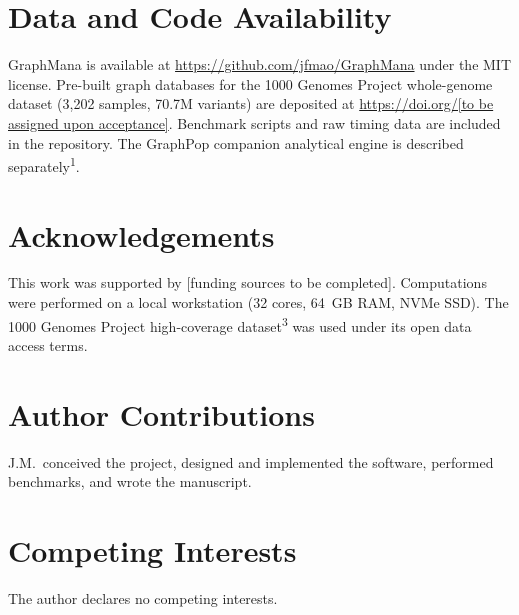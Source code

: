 \documentclass[11pt,a4paper]{article}
\newcommand{\citenum}[1]{\textsuperscript{#1}}
\begin{document}

\section*{Data and Code Availability}

GraphMana is available at \url{https://github.com/jfmao/GraphMana} under the MIT license. Pre-built graph databases for the 1000 Genomes Project whole-genome dataset (3,202 samples, 70.7M variants) are deposited at \url{https://doi.org/[to be assigned upon acceptance]}. Benchmark scripts and raw timing data are included in the repository. The GraphPop companion analytical engine is described separately\citenum{1}.

\section*{Acknowledgements}

This work was supported by [funding sources to be completed]. Computations were performed on a local workstation (32 cores, 64~GB RAM, NVMe SSD). The 1000 Genomes Project high-coverage dataset\citenum{3} was used under its open data access terms.

\section*{Author Contributions}

J.M.\ conceived the project, designed and implemented the software, performed benchmarks, and wrote the manuscript.

\section*{Competing Interests}

The author declares no competing interests.
\end{document}
